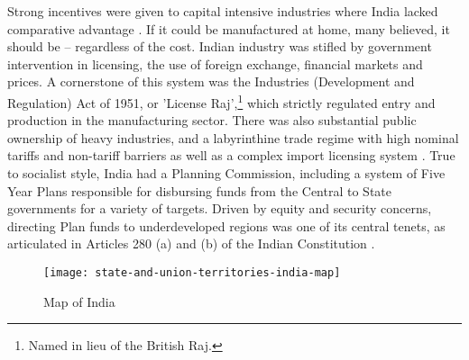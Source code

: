 \documentclass[a4paper, 11pt]{article}
\begin{document}
Strong incentives were given to capital intensive industries where India lacked comparative advantage \citep{kotwal_economic_2011}.  If it could be manufactured at home, many believed, it should be -- regardless of the cost.  Indian industry was stifled by government intervention in licensing, the use of foreign exchange, financial markets and prices.  A cornerstone of this system was the Industries (Development and Regulation) Act of 1951, or 'License Raj',\footnote{Named in lieu of the British Raj.} which strictly regulated entry and production in the manufacturing sector.  There was also substantial public ownership of heavy industries, and a labyrinthine trade regime with high nominal tariffs and non-tariff barriers as well as a complex import licensing system \citep{topalova_trade_2005}.  True to socialist style, India had a Planning Commission, including a system of Five Year Plans responsible for disbursing funds from the Central to State governments for a variety of targets.  Driven by equity and security concerns, directing Plan funds to underdeveloped regions was one of its central tenets, as articulated in Articles 280 (a) and (b) of the Indian Constitution \citep{ghosh_economic_2008,cherodian_regional_2015}.\par
    
\begin{figure}[!h]
\texttt{[image: state-and-union-territories-india-map]}
\caption{Map of India}
\end{figure}
\end{document}
